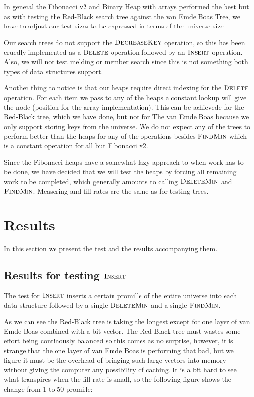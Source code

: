 \documentclass[oneside,11pt,openright]{report}
\newcommand{\FindMin}{\textsc{FindMin}}
\newcommand{\Insert}{\textsc{Insert}}
\newcommand{\DeleteMin}{\textsc{DeleteMin}}
\newcommand{\DecreaseKey}{\textsc{DecreaseKey}}
\newcommand{\Delete}{\textsc{Delete}}
\begin{document}


In general the Fibonacci v2 and Binary Heap with arrays performed the best but as with testing the Red-Black search tree against the van Emde Boas Tree, we have to adjust our test sizes to be expressed in terms of the universe size.

Our search trees do not support the $\DecreaseKey$ operation, so this has been cruedly implemented as a $\Delete$ operation followed by an $\Insert$ operation. Also, we will not test melding or member search since this is not something both types of data structures support.

Another thing to notice is that our heaps require direct indexing for the $\Delete$ operation. For each item we pass to any of the heaps a constant lookup will give the node (position for the array implementation). This can be achievede for the Red-Black tree, which we have done, but not for The van Emde Boas because we only support storing keys from the universe. We do not expect any of the trees to perform better than the heaps for any of the operations besides $\FindMin$ which is a constant operation for all but Fibonacci v2.

Since the Fibonacci heaps have a somewhat lazy approach to when work has to be done, we have decided that we will test the heaps by forcing all remaining work to be completed, which generally amounts to calling $\DeleteMin$ and $\FindMin$. Measering and fill-rates are the same as for testing trees.

\section{Results}

In this section we present the test and the results accompanying them.

\subsection{Results for testing $\Insert$}

 The test for $\Insert$ inserts a certain promille of the entire universe into each data structure followed by a single $\DeleteMin$ and a single $\FindMin$.



As we can see the Red-Black tree is taking the longest except for one layer of van Emde Boas combined with a bit-vector. The Red-Black tree must wastes some effort being continously balanced so this comes as no surprise, however, it is strange that the one layer of van Emde Boas is performing that bad, but we figure it must be the overhead of bringing such large vectors into memory without giving the computer any possibility of caching. It is a bit hard to see what transpires when the fill-rate is small, so the following figure shows the change from 1 to 50 promille:
\end{document}
